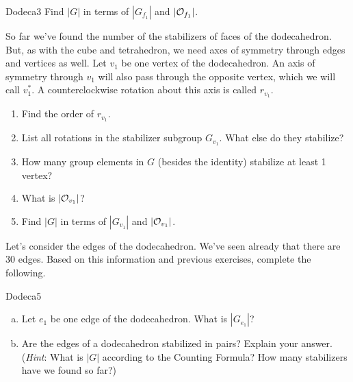\begin {exercise}{Dodeca3}
Find $|G|$ in terms of $|G_{f_1}|$ and $|{\cal O}_{f_1}|$.
\end {exercise}
So far we've found the number of the stabilizers of faces of the dodecahedron.  But, as with the cube and tetrahedron, we need axes of symmetry through edges and vertices as well.
Let $v_1$ be one vertex of the dodecahedron.  An axis of symmetry through $v_1$ will also pass through the opposite vertex, which we will call $v_1^*$.  A counterclockwise rotation about this axis is called $r_{v_1}$.

\begin{exercise}\label{exercise:actions:Dodeca4}
\begin {enumerate} 
\item Find the order of $r_{v_1}$.
\item List all rotations in the stabilizer subgroup $G_{v_1}$.  What else do they stabilize?
\item How many group elements in $G$ (besides the identity) stabilize at least 1 vertex?
\item What is $|{\cal O}_{v_1}|$?
\item Find $|G|$ in terms of $|G_{v_1}|$ and $|{\cal O}_{v_1}|$.
\end{enumerate}
\end{exercise}
Let's consider the edges of the dodecahedron.  We've seen already that there are 30 edges.  Based on this information and previous exercises, complete the following.

\begin {exercise}{Dodeca5}
\begin {enumerate}[(a)]
\item Let $e_1$ be one edge of the dodecahedron. What is $|G_{e_1}|$?
\item Are the edges of a dodecahedron stabilized in pairs?  Explain your answer. (\emph{Hint}:  What is $|G|$ according to the Counting Formula?  How many stabilizers have we found so far?)
\end{enumerate}
\end{exercise}

